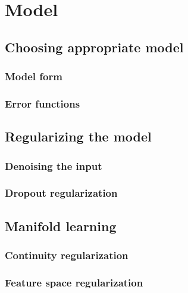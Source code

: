 
\chapter{Model}

\label{ch:mode}

\section{Choosing appropriate model}
\subsection{Model form}
\subsection{Error functions}

\section{Regularizing the model}
\subsection{Denoising the input}
\subsection{Dropout regularization}

\section{Manifold learning}
\subsection{Continuity regularization}
\subsection{Feature space regularization}
